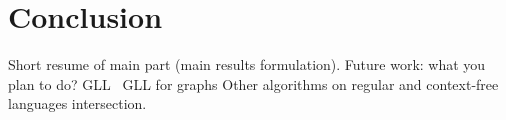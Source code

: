 \section{Conclusion}

Short resume of main part (main results formulation).
Future work: what you plan to do? 
GLL~\cite{scott2010gll}
GLL for graphs
Other algorithms on regular and context-free languages intersection.
